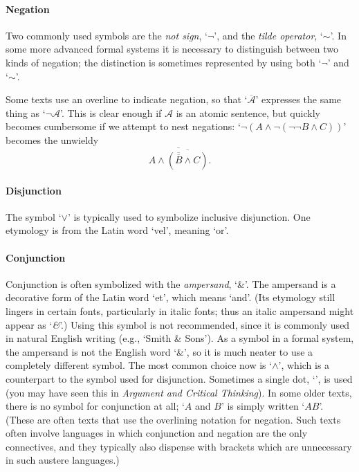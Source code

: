 \paragraph{Negation} Two commonly used symbols are the \emph{not sign}, `$¬$', and the \emph{tilde operator}, `$∼$'. In some more advanced formal systems it is necessary to distinguish between two kinds of negation; the distinction is sometimes represented by using both `$¬$' and `$∼$'.

Some texts use an overline to indicate negation, so that `$\overline{\mathscr{A}}$' expresses the same thing as `$¬\mathscr{A}$'. This is clear enough if $\mathscr{A}$ is an atomic sentence, but quickly becomes cumbersome if we attempt to nest negations: `$¬(A \wedge ¬(¬¬B \wedge C))$' becomes the unwieldy $$\overline{A \wedge \overline{(\overline{\overline{B}}\wedge C)}}.$$

\paragraph{Disjunction} The symbol `$\vee$' is typically used to symbolize inclusive disjunction. One etymology is from the Latin word `vel', meaning `or'.%

\paragraph{Conjunction}
Conjunction is often symbolized with the \emph{ampersand}, `{\&}'. The ampersand is a decorative form of the Latin word `et', which means `and'.  (Its etymology still lingers in certain fonts, particularly in italic fonts; thus an italic ampersand might appear as `\emph{\&}'.) Using this symbol is not recommended, since it is commonly used in natural English writing (e.g., `Smith \& Sons'). As a symbol in a formal system, the ampersand is not the English word `\&', so it is much neater to use a completely different symbol. The most common choice now is `$\wedge$', which is a counterpart to the symbol used for disjunction. Sometimes a single dot, `{\scriptsize\textbullet}', is used (you may have seen this in \emph{Argument and Critical Thinking}). In some older texts, there is no symbol for conjunction at all; `$A$ and $B$' is simply written `$AB$'. (These are often texts that use the overlining notation for negation. Such texts often involve languages in which conjunction and negation are the only connectives, and they typically also dispense with brackets which are unnecessary in such austere languages.)

